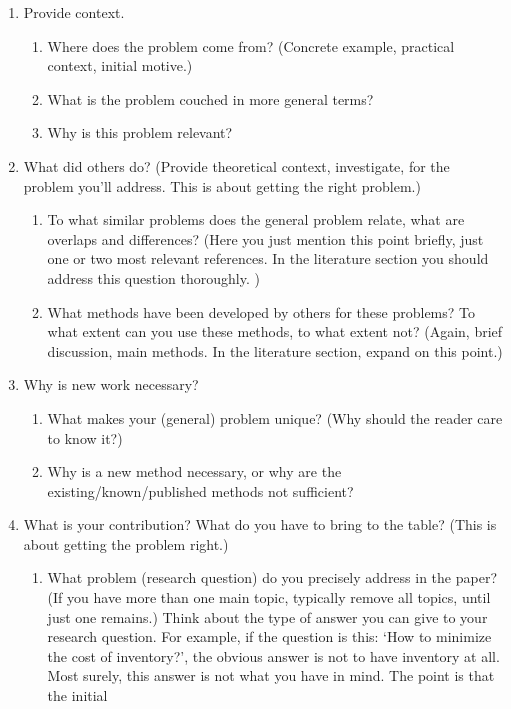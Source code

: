 \documentclass{article}
\begin{document}
\begin{enumerate}
\item Provide context.
  \begin{enumerate}
\item Where does the problem come from? (Concrete example, practical context, initial motive.)
\item What is the problem couched in more general terms?
\item Why is this problem relevant?
  \end{enumerate}
\item What did others do? (Provide theoretical context, investigate,
  for the problem you'll address.  This is about getting the right
  problem.)
  \begin{enumerate}
  \item To what similar problems does the general problem relate, what
    are overlaps and differences?  (Here you just mention this point
    briefly, just one or two most relevant references.  In the
    literature section you should address this question thoroughly. )
  \item What methods have been developed by others for these problems?
    To what extent can you use these methods, to what extent not?
    (Again, brief discussion, main methods.  In the literature
    section, expand on this point.)
  \end{enumerate}
\item Why is new work necessary?
  \begin{enumerate}
  \item What makes your (general) problem unique? (Why should the
    reader care to know it?)
\item Why is a new method necessary, or why are the
  existing/known/published methods not sufficient? 
  \end{enumerate}
\item What is your contribution? What do you have to bring to the
  table? (This is about getting the problem right.)
  \begin{enumerate}
  \item What problem (research question) do you precisely address in
    the paper? (If you have more than one main topic, typically remove
    all topics, until just one remains.) Think about the type of
    answer you can give to your research question. For example, if the
    question is this: `How to minimize the cost of inventory?', the
    obvious answer is not to have inventory at all. Most surely, this
    answer is not what you have in mind. The point is that the initial

\end{enumerate}
\end{enumerate}
\end{document}
